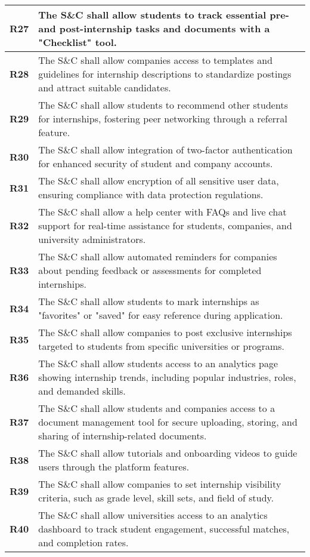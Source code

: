 \begin{longtable}{|p{}|p{}|}
\hline
\textbf{R27} & The S\&C shall allow students to track essential pre- and post-internship tasks and documents with a "Checklist" tool. \\ 
\hline
\textbf{R28} & The S\&C shall allow companies access to templates and guidelines for internship descriptions to standardize postings and attract suitable candidates. \\ 
\hline
\textbf{R29} & The S\&C shall allow students to recommend other students for internships, fostering peer networking through a referral feature. \\ 
\hline
\textbf{R30} & The S\&C shall allow integration of two-factor authentication for enhanced security of student and company accounts. \\ 
\hline
\textbf{R31} & The S\&C shall allow encryption of all sensitive user data, ensuring compliance with data protection regulations. \\ 
\hline
\textbf{R32} & The S\&C shall allow a help center with FAQs and live chat support for real-time assistance for students, companies, and university administrators. \\ 
\hline
\textbf{R33} & The S\&C shall allow automated reminders for companies about pending feedback or assessments for completed internships. \\ 
\hline
\textbf{R34} & The S\&C shall allow students to mark internships as "favorites" or "saved" for easy reference during application. \\ 
\hline
\textbf{R35} & The S\&C shall allow companies to post exclusive internships targeted to students from specific universities or programs. \\ 
\hline
\textbf{R36} & The S\&C shall allow students access to an analytics page showing internship trends, including popular industries, roles, and demanded skills. \\ 
\hline
\textbf{R37} & The S\&C shall allow students and companies access to a document management tool for secure uploading, storing, and sharing of internship-related documents. \\ 
\hline
\textbf{R38} & The S\&C shall allow tutorials and onboarding videos to guide users through the platform features. \\ 
\hline
\textbf{R39} & The S\&C shall allow companies to set internship visibility criteria, such as grade level, skill sets, and field of study. \\ 
\hline
\textbf{R40} & The S\&C shall allow universities access to an analytics dashboard to track student engagement, successful matches, and completion rates. \\ 

\end{longtable}
